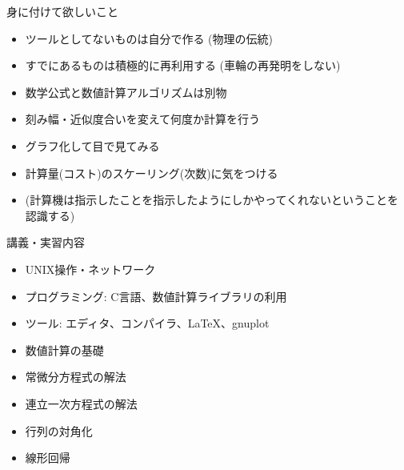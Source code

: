 \begin{frame}[t]{身に付けて欲しいこと}
  \begin{itemize}
  \item ツールとしてないものは自分で作る (物理の伝統)
  \item すでにあるものは積極的に再利用する (車輪の再発明をしない)
  \item 数学公式と数値計算アルゴリズムは別物
  \item 刻み幅・近似度合いを変えて何度か計算を行う
  \item グラフ化して目で見てみる
  \item 計算量(コスト)のスケーリング(次数)に気をつける
  \item (計算機は指示したことを指示したようにしかやってくれないということを認識する)
  \end{itemize}
\end{frame}

\begin{frame}[t]{講義・実習内容}
  \begin{itemize}
  \item UNIX操作・ネットワーク
  \item プログラミング: C言語、数値計算ライブラリの利用
  \item ツール: エディタ、コンパイラ、\LaTeX、gnuplot
  \item 数値計算の基礎
  \item 常微分方程式の解法
  \item 連立一次方程式の解法
  \item 行列の対角化
  \item 線形回帰
  \end{itemize}
\end{frame}

